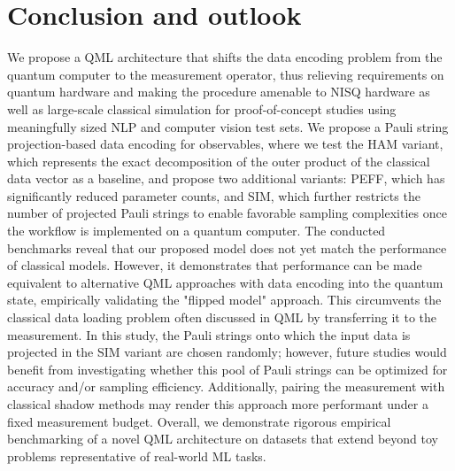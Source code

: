 \documentclass[../main.tex]{subfiles}
\begin{document}
\section{Conclusion and outlook}
We propose a QML architecture that shifts the data encoding problem from the quantum computer to the measurement operator, thus relieving requirements on quantum hardware and making the procedure amenable to NISQ hardware as well as large-scale classical simulation for proof-of-concept studies using meaningfully sized NLP and computer vision test sets. We propose a Pauli string projection-based data encoding for observables, where we test the HAM variant, which represents the exact decomposition of the outer product of the classical data vector as a baseline, and propose two additional variants: PEFF, which has significantly reduced parameter counts, and SIM, which further restricts the number of projected Pauli strings to enable favorable sampling complexities once the workflow is implemented on a quantum computer.
The conducted benchmarks reveal that our proposed model does not yet match the performance of classical models. However, it demonstrates that performance can be made equivalent to alternative QML approaches with data encoding into the quantum state, empirically validating the "flipped model" approach. This circumvents the classical data loading problem often discussed in QML by transferring it to the measurement. In this study, the Pauli strings onto which the input data is projected in the SIM variant are chosen randomly; however, future studies would benefit from investigating whether this pool of Pauli strings can be optimized for accuracy and/or sampling efficiency. Additionally, pairing the measurement with classical shadow methods \cite{huang2020predicting} may render this approach more performant under a fixed measurement budget. Overall, we demonstrate rigorous empirical benchmarking of a novel QML architecture on datasets that extend beyond toy problems representative of real-world ML tasks.


    
\end{document}
